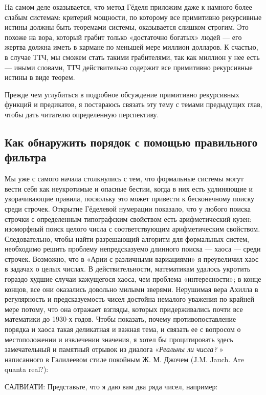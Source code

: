 \documentclass[../main.tex]{subfiles}
\begin{document}
На самом деле оказывается, что метод Гёделя приложим даже к намного более слабым системам: критерий мощности, по которому все примитивно рекурсивные истины должны быть теоремами системы, оказывается слишком строгим. Это похоже на вора, который грабит только «достаточно богатых» людей --- его жертва должна иметь в кармане по меньшей мере миллион долларов. К счастью, в случае ТТЧ, мы сможем стать такими грабителями, так как миллион у нее есть --- иными словами, ТТЧ действительно содержит все примитивно рекурсивные истины в виде теорем.

Прежде чем углубиться в подробное обсуждение примитивно рекурсивных функций и предикатов, я постараюсь связать эту тему с темами предыдущих глав, чтобы дать читателю определенную перспективу.


\subsection{Как обнаружить порядок с помощью правильного фильтра}

Мы уже с самого начала столкнулись с тем, что формальные системы могут вести себя как неукротимые и опасные бестии, когда в них есть удлиняющие и укорачивающие правила, поскольку это может привести к бесконечному поиску среди строчек. Открытие Гёделевой нумерации показало, что у любого поиска строчки с определенным типографским свойством есть арифметический кузен: изоморфный поиск целого числа с соответствующим арифметическим свойством. Следовательно, чтобы найти разрешающий алгоритм для формальных систем, необходимо решить проблему непредсказуемо длинного поиска --- хаоса --- среди строчек. Возможно, что в «Арии с различными вариациями» я преувеличил хаос в задачах о целых числах. В действительности, математикам удалось укротить гораздо худшие случаи кажущегося хаоса, чем проблема «интересности»; в конце концов, все они оказались довольно милыми зверями. Нерушимая вера Ахилла в регулярность и предсказуемость чисел достойна немалого уважения по крайней мере потому, что она отражает взгляды, которых придерживались почти все математики до 1930-х годов. Чтобы показать, почему противопоставление порядка и хаоса такая деликатная и важная тема, и связать ее с вопросом о местоположении и извлечении значения, я хотел бы процитировать здесь замечательный и памятный отрывок из диалога «\emph{Реальны ли числа?} » написанного в Галилеевом стиле покойным Ж. М. Джочем (J.M. Jauch. Are quanta real?):

САЛВИАТИ: Представьте, что я даю вам два ряда чисел, например:
\end{document}
